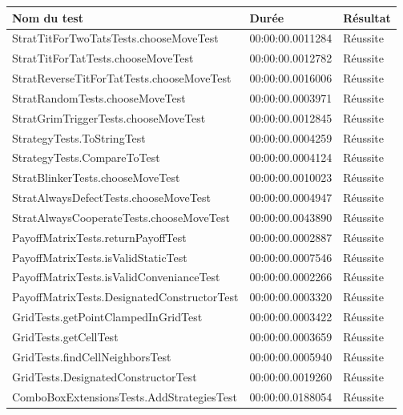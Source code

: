 \documentclass[a4paper]{article}
\begin{document}
\begin{table}[htp]
\centering
\begin{tabular}{lll}
\hline
\textbf{Nom du test}                        & \textbf{Durée}   & \textbf{Résultat} \\ \hline
StratTitForTwoTatsTests.chooseMoveTest      & 00:00:00.0011284 & Réussite          \\
StratTitForTatTests.chooseMoveTest          & 00:00:00.0012782 & Réussite          \\
StratReverseTitForTatTests.chooseMoveTest   & 00:00:00.0016006 & Réussite          \\
StratRandomTests.chooseMoveTest             & 00:00:00.0003971 & Réussite          \\
StratGrimTriggerTests.chooseMoveTest        & 00:00:00.0012845 & Réussite          \\
StrategyTests.ToStringTest                  & 00:00:00.0004259 & Réussite          \\
StrategyTests.CompareToTest                 & 00:00:00.0004124 & Réussite          \\
StratBlinkerTests.chooseMoveTest            & 00:00:00.0010023 & Réussite          \\
StratAlwaysDefectTests.chooseMoveTest       & 00:00:00.0004947 & Réussite          \\
StratAlwaysCooperateTests.chooseMoveTest    & 00:00:00.0043890 & Réussite          \\
PayoffMatrixTests.returnPayoffTest          & 00:00:00.0002887 & Réussite          \\
PayoffMatrixTests.isValidStaticTest         & 00:00:00.0007546 & Réussite          \\
PayoffMatrixTests.isValidConvenianceTest    & 00:00:00.0002266 & Réussite          \\
PayoffMatrixTests.DesignatedConstructorTest & 00:00:00.0003320 & Réussite          \\
GridTests.getPointClampedInGridTest         & 00:00:00.0003422 & Réussite          \\
GridTests.getCellTest                       & 00:00:00.0003659 & Réussite          \\
GridTests.findCellNeighborsTest             & 00:00:00.0005940 & Réussite          \\
GridTests.DesignatedConstructorTest         & 00:00:00.0019260 & Réussite          \\
ComboBoxExtensionsTests.AddStrategiesTest   & 00:00:00.0188054 & Réussite          \\

\end{tabular}
\end{table}
\end{document}
